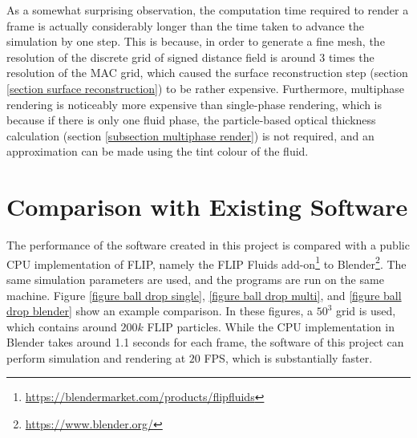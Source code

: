 As a somewhat surprising observation, the computation time required to render a frame is actually considerably longer than the time taken to advance the simulation by one step. This is because, in order to generate a fine mesh, the resolution of the discrete grid of signed distance field is around 3 times the resolution of the MAC grid, which caused the surface reconstruction step (section \ref{section surface reconstruction}) to be rather expensive. Furthermore, multiphase rendering is noticeably more expensive than single-phase rendering, which is because if there is only one fluid phase, the particle-based optical thickness calculation (section \ref{subsection multiphase render}) is not required, and an approximation can be made using the tint colour of the fluid.

\section{Comparison with Existing Software}

The performance of the software created in this project is compared with a public CPU implementation of FLIP, namely the FLIP Fluids add-on\footnote{\url{https://blendermarket.com/products/flipfluids}} to Blender\footnote{\url{https://www.blender.org/}}. The same simulation parameters are used, and the programs are run on the same machine. Figure \ref{figure ball drop single}, \ref{figure ball drop multi}, and \ref{figure ball drop blender} show an example comparison. In these figures, a $50^3$ grid is used, which contains around $200k$ FLIP particles. While the CPU implementation in Blender takes around 1.1 seconds for each frame, the software of this project can perform simulation and rendering at $20$ FPS, which is substantially faster.

\gapM
\gapM
\gapM

